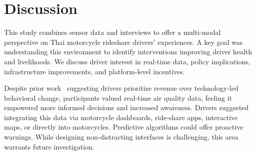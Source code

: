 \section{Discussion}

This study combines sensor data and interviews to offer a multi-modal perspective on Thai motorcycle rideshare drivers' experiences.
A key goal was understanding this environment to identify interventions improving driver health and livelihoods.
We discuss driver interest in real-time data, policy implications, infrastructure improvements, and platform-level incentives.

Despite prior work~\cite{tieanklin2024rideshare} suggesting drivers prioritize revenue over technology-led behavioral change, participants valued real-time air quality data, feeling it empowered more informed decisions and increased awareness.
Drivers suggested integrating this data via motorcycle dashboards, ride-share apps, interactive maps, or directly into motorcycles.
Predictive algorithms could offer proactive warnings.
While designing non-distracting interfaces is challenging, this area warrants future investigation.

